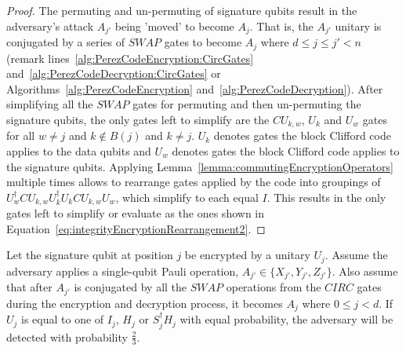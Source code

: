 \begin{proof}
The permuting and un-permuting of signature qubits result in the adversary's attack $A_{j'}$ being 'moved' to become $A_j$. That is, the $A_{j'}$ unitary is conjugated by a series of $\mathit{SWAP}$ gates to become $A_{j}$ where $d \leq j \leq j' < n$ (remark lines~\ref{alg:PerezCodeEncryption:CircGates} and~\ref{alg:PerezCodeDecryption:CircGates} or Algorithms~\ref{alg:PerezCodeEncryption} and~\ref{alg:PerezCodeDecryption}). After simplifying all the $\mathit{SWAP}$ gates for permuting and then un-permuting the signature qubits, the only gates left to simplify are the $\mathit{CU}_{k,w}$, $U_k$ and $U_w$ gates for all $w \neq j$ and $k \notin B(j)$ and $k \neq j$. $U_k$ denotes gates the block Clifford code applies to the data qubits and $U_w$ denotes gates the block Clifford code applies to the signature qubits. Applying Lemma~\ref{lemma:commutingEncryptionOperators} multiple times allows to rearrange gates applied by the code into groupings of  $U_w^{\dagger}\mathit{CU}_{k,w}U_k^{\dagger}U_k\mathit{CU}_{k,w}U_w$, which simplify to each equal $I$. This results in the only gates left to simplify or evaluate as the ones shown in Equation~\eqref{eq:integrityEncryptionRearrangement2}.
\end{proof}
\begin{theorem}
\label{theorem:singleQubitAttackOnSignatureQubit}
Let the signature qubit at position $j$ be encrypted by a unitary $U_j$. Assume the adversary applies a single-qubit Pauli operation, $A_{j'} \in \{X_{j'}, Y_{j'}, Z_{j'}\}$. Also assume that after $A_{j'}$ is conjugated by all the $\mathit{SWAP}$ operations from the $\mathit{CIRC}$ gates during the encryption and decryption process, it becomes $A_j$ where $0 \leq j < d$. If $U_j$ is equal to one of $I_j$, $H_j$ or $S_j^{\dagger}H_j$ with equal probability, the adversary will be detected with probability $\frac{2}{3}$.
\end{theorem}
